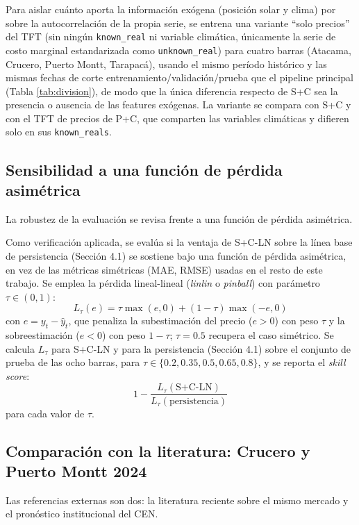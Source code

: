 Para aislar cuánto aporta la información exógena (posición solar y clima) por sobre la autocorrelación de la propia serie, se entrena una variante ``solo precios'' del TFT (sin ningún \texttt{known\_real} ni variable climática, únicamente la serie de costo marginal estandarizada como \texttt{unknown\_real}) para cuatro barras (Atacama, Crucero, Puerto Montt, Tarapacá), usando el mismo período histórico y las mismas fechas de corte entrenamiento/validación/prueba que el pipeline principal (Tabla \ref{tab:division}), de modo que la única diferencia respecto de S+C sea la presencia o ausencia de las features exógenas. La variante se compara con S+C y con el TFT de precios de P+C, que comparten las variables climáticas y difieren solo en sus \texttt{known\_reals}.

\subsection{Sensibilidad a una función de pérdida asimétrica}
\label{sec:perdida_asimetrica_meta}

La robustez de la evaluación se revisa frente a una función de pérdida asimétrica.

Como verificación aplicada, se evalúa si la ventaja de S+C-LN sobre la línea base de persistencia (Sección 4.1) se sostiene bajo una función de pérdida asimétrica, en vez de las métricas simétricas (MAE, RMSE) usadas en el resto de este trabajo. Se emplea la pérdida lineal-lineal (\textit{linlin} o \textit{pinball}) con parámetro $\tau \in (0,1)$:
\[
    L_\tau(e) = \tau \max(e,0) + (1-\tau)\max(-e,0)
\]
con $e = y_t - \hat{y}_t$, que penaliza la subestimación del precio ($e>0$) con peso $\tau$ y la sobreestimación ($e<0$) con peso $1-\tau$; $\tau=0.5$ recupera el caso simétrico. Se calcula $L_\tau$ para S+C-LN y para la persistencia (Sección 4.1) sobre el conjunto de prueba de las ocho barras, para $\tau \in \{0.2, 0.35, 0.5, 0.65, 0.8\}$, y se reporta el \textit{skill score}:
\[
    1 - \frac{L_\tau(\text{S+C-LN})}{L_\tau(\text{persistencia})}
\]
para cada valor de $\tau$.

\subsection{Comparación con la literatura: Crucero y Puerto Montt 2024}
\label{sec:crucero_leon_meta}

Las referencias externas son dos: la literatura reciente sobre el mismo mercado y el pronóstico institucional del CEN.

